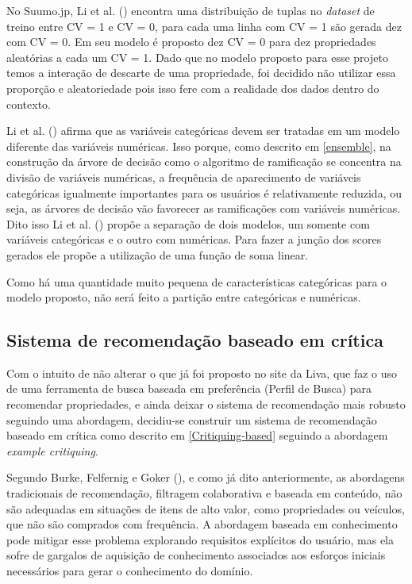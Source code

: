 No Suumo.jp, Li et al. (\citeyear{Summo:2017}) encontra uma distribuição de tuplas no \textit{dataset} de treino entre CV = 1 e CV = 0, para cada uma linha com CV = 1 são gerada dez com CV = 0. Em seu modelo é proposto dez CV = 0 para dez propriedades aleatórias a cada um CV = 1. Dado que no modelo proposto para esse projeto temos a interação de descarte de uma propriedade, foi decidido não utilizar essa proporção e aleatoriedade pois isso fere com a  realidade dos dados dentro do contexto.

Li et al. (\citeyear{Summo:2017}) afirma que as variáveis categóricas devem ser tratadas em um modelo diferente das variáveis numéricas. Isso porque, como descrito em \ref{ensemble}, na construção da árvore de decisão como o algoritmo de ramificação se concentra na divisão de variáveis numéricas, a frequência de aparecimento de variáveis categóricas igualmente importantes para os usuários é relativamente reduzida, ou seja, as árvores de decisão vão favorecer as ramificações com variáveis numéricas. Dito isso Li et al. (\citeyear{Summo:2017}) propõe a separação de dois modelos, um somente com variáveis categóricas e o outro com numéricas. Para fazer a junção dos scores gerados ele propõe a utilização de uma função de soma linear.

Como há uma quantidade muito pequena de características categóricas para o modelo proposto, não será feito a partição entre categóricas e numéricas.

\subsection{Sistema de recomendação baseado em crítica}

Com o intuito de não alterar o que já foi proposto no site da Liva, que faz o uso de uma ferramenta de busca baseada em preferência (Perfil de Busca) para recomendar propriedades, e ainda deixar o sistema de recomendação mais robusto seguindo uma abordagem, decidiu-se construir um sistema de recomendação baseado em crítica como descrito em \ref{Critiquing-based} seguindo a abordagem \textit{example critiquing}.
	
Segundo Burke, Felfernig e Goker (\citeyear{Burke}), e como já dito anteriormente, as abordagens tradicionais de recomendação, filtragem colaborativa e baseada em conteúdo, não são adequadas em situações de itens de alto valor, como propriedades ou veículos, que não são comprados com frequência. A abordagem baseada em conhecimento pode mitigar esse problema explorando requisitos explícitos do usuário, mas ela sofre de gargalos de aquisição de conhecimento associados aos esforços iniciais necessários para gerar o conhecimento do domínio.

